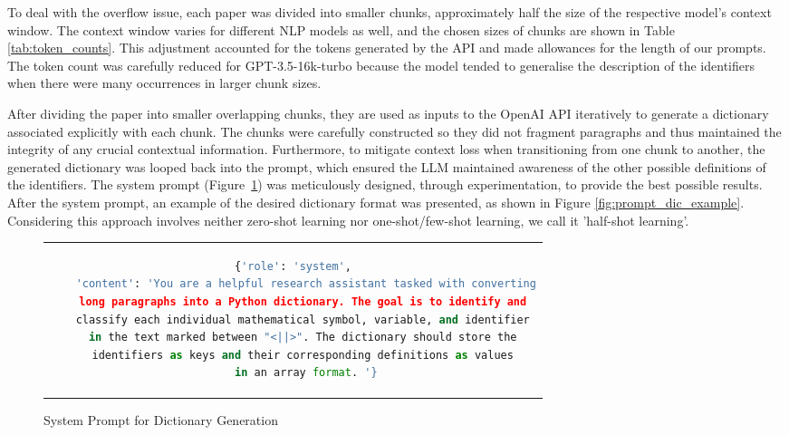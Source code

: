 To deal with the overflow issue, each paper was divided into smaller chunks, approximately half the size of the respective model's context window. The context window varies for different \ac{NLP} models as well, and the chosen sizes of chunks are shown in Table \ref{tab:token_counts}. This adjustment accounted for the tokens generated by the API and made allowances for the length of our prompts. The token count was carefully reduced for GPT-3.5-16k-turbo because the model tended to generalise the description of the identifiers when there were many occurrences in larger chunk sizes.

After dividing the paper into smaller overlapping chunks, they are used as inputs to the OpenAI API iteratively to generate a dictionary associated explicitly with each chunk. The chunks were carefully constructed so they did not fragment paragraphs and thus maintained the integrity of any crucial contextual information. Furthermore, to mitigate context loss when transitioning from one chunk to another, the generated dictionary was looped back into the prompt, which ensured the LLM maintained awareness of the other possible definitions of the identifiers. The system prompt (Figure~\ref{fig:prompt_dic_system}) was meticulously designed, through experimentation, to provide the best possible results. After the system prompt, an example of the desired dictionary format was presented, as shown in Figure \ref{fig:prompt_dic_example}. Considering this approach involves neither zero-shot learning nor one-shot/few-shot learning, we call it  'half-shot learning'. 

\begin{figure}[htpb]
  \centering
  \begin{tabular}{c}
  \begin{lstlisting}[language=python]
    {'role': 'system',
    'content': 'You are a helpful research assistant tasked with converting
    long paragraphs into a Python dictionary. The goal is to identify and 
    classify each individual mathematical symbol, variable, and identifier 
    in the text marked between "<||>". The dictionary should store the 
    identifiers as keys and their corresponding definitions as values 
    in an array format. '}
  \end{lstlisting}
  \end{tabular}
  \caption[System Prompt for Dictionary Generation]{System Prompt for Dictionary Generation}\label{fig:prompt_dic_system}
\end{figure}

